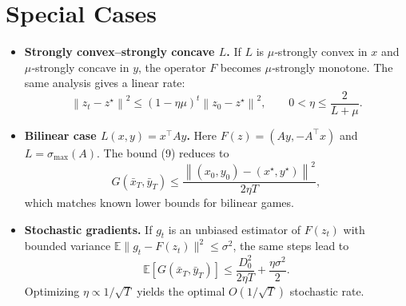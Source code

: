 \documentclass{article}
\newcommand{\F}{F}
\newcommand{\z}{z}
\newcommand{\zz}{z^{\star}}
\newcommand{\norm}[1]{\left\|#1\right\|}
\begin{document}
\section*{Special Cases}
\begin{itemize}
\item \textbf{Strongly convex–strongly concave $L$.} If $L$ is $\mu$‑strongly convex in $x$ and $\mu$‑strongly concave in $y$, the operator $\F$ becomes $\mu$‑strongly monotone. The same analysis gives a linear rate:
\[
\norm{\z_{t}-\zz}^{2}\le (1-\eta\mu)^{t}\norm{\z_{0}-\zz}^{2},
\qquad 0<\eta\le\frac{2}{L+\mu}.
\]

\item \textbf{Bilinear case $L(x,y)=x^{\top}Ay$.} Here $\F(\z)=(Ay,-A^{\top}x)$ and $L=\sigma_{\max}(A)$. The bound (9) reduces to
\[
G(\bar{x}_{T},\bar{y}_{T})\le \frac{\norm{(x_{0},y_{0})-(x^{\star},y^{\star})}^{2}}{2\eta T},
\]
which matches known lower bounds for bilinear games.

\item \textbf{Stochastic gradients.} If $g_{t}$ is an unbiased estimator of $\F(\z_{t})$ with bounded variance $\mathbb{E}\|g_{t}-\F(\z_{t})\|^{2}\le\sigma^{2}$, the same steps lead to
\[
\mathbb{E}[G(\bar{x}_{T},\bar{y}_{T})]\le \frac{D_{0}^{2}}{2\eta T}+ \frac{\eta\sigma^{2}}{2}.
\]
Optimizing $\eta\propto 1/\sqrt{T}$ yields the optimal $O(1/\sqrt{T})$ stochastic rate.
\end{itemize}
\end{document}
